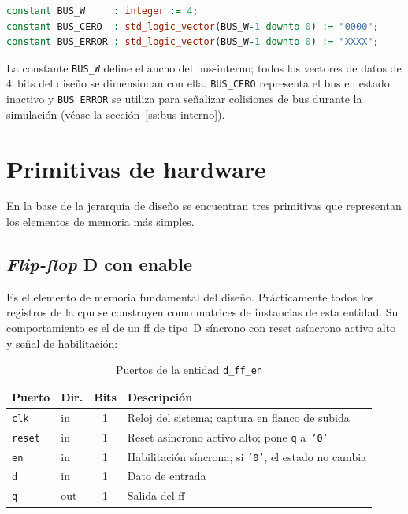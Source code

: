 \documentclass[%
    school=etsisi,%
    type=pfg,%
    degree=61CI,%
]{upm-report}
\newcommand{\vhdlfile}[1]{%
    \par\noindent{\small\sffamily\color{gray}Fichero: \texttt{#1}}\par\smallskip
}
\begin{document}
\begin{lstlisting}[language=VHDL, caption={Contenido del paquete \texttt{pkg\_4004}},
    label=lst:pkg4004]
constant BUS_W     : integer := 4;
constant BUS_CERO  : std_logic_vector(BUS_W-1 downto 0) := "0000";
constant BUS_ERROR : std_logic_vector(BUS_W-1 downto 0) := "XXXX";
\end{lstlisting}

La constante \texttt{BUS\_W} define el ancho del \gls{bus-interno}; todos los
vectores de datos de 4~bits del diseño se dimensionan con ella.
\texttt{BUS\_CERO} representa el bus en estado inactivo y \texttt{BUS\_ERROR}
se utiliza para señalizar colisiones de bus durante la simulación (véase
la sección~\ref{ss:bus-interno}).

\clearpage
\section{Primitivas de hardware}
\label{s:primitivas}

En la base de la jerarquía de diseño se encuentran tres primitivas
que representan los elementos de memoria más simples.

\subsection{\textit{Flip-flop} D con enable}
\label{ss:d-ff-en}
\vhdlfile{d\_ff\_en.vhd}

Es el elemento de memoria fundamental del diseño.  Prácticamente todos los
registros de la \acrshort{cpu} se construyen como matrices de instancias de
esta entidad.  Su comportamiento es el de un \acrfull{ff} de tipo~D síncrono
con reset asíncrono activo alto y señal de habilitación:

\begin{table}[H]
\centering
\caption{Puertos de la entidad \texttt{d\_ff\_en}}
\label{tab:d-ff-en}
\begin{tabularx}{\textwidth}{@{}llcX@{}}
\toprule
\textbf{Puerto} & \textbf{Dir.} & \textbf{Bits} & \textbf{Descripción} \\
\midrule
\texttt{clk}   & in  & 1 & Reloj del sistema; captura en flanco de subida \\
\texttt{reset} & in  & 1 & Reset asíncrono activo alto; pone \texttt{q} a~\texttt{'0'} \\
\texttt{en}    & in  & 1 & Habilitación síncrona; si \texttt{'0'}, el estado no cambia \\
\texttt{d}     & in  & 1 & Dato de entrada \\
\texttt{q}     & out & 1 & Salida del \acrshort{ff} \\
\bottomrule
\end{tabularx}
\end{table}
\end{document}
